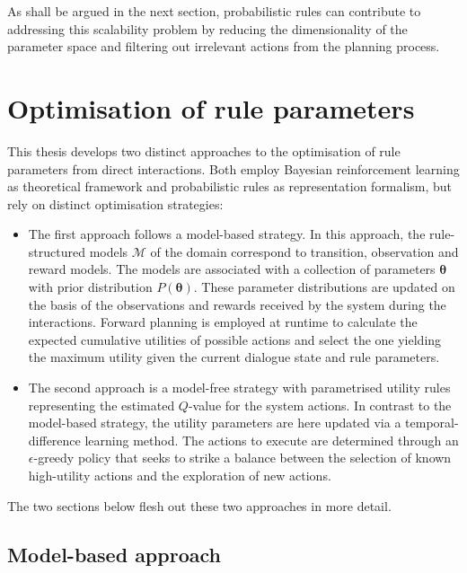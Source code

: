 As shall be argued in the next section, probabilistic rules can contribute to addressing this scalability problem by reducing the dimensionality of the parameter space and filtering out irrelevant actions from the planning process.

\section{Optimisation of rule parameters}
\label{sec:rl-ruleparams}

This thesis develops two distinct approaches to the optimisation of rule parameters from direct interactions. Both employ Bayesian reinforcement learning as theoretical framework and probabilistic rules as representation formalism, but rely on distinct optimisation strategies:

\begin{itemize}
\item The first approach follows a model-based strategy.  In this approach, the rule-structured models $\mathcal{M}$ of the domain correspond to transition, observation and reward models. The models are associated with a collection of parameters $\boldsymbol\theta$ with prior distribution $P(\boldsymbol\theta)$.  These parameter distributions are updated on the basis of the observations and rewards received by the system during the interactions. Forward planning is employed at runtime to calculate the expected cumulative utilities of possible actions and select the one yielding the maximum utility given the current dialogue state and rule parameters. 

\item The second approach is a model-free strategy with parametrised utility rules representing the estimated $Q$-value for the system actions. In contrast to the model-based strategy, the utility parameters are here updated via a temporal-difference learning method.  The actions to execute are determined through an $\epsilon$-greedy policy that seeks to strike a balance between the selection of known high-utility actions and the exploration of new actions.

\end{itemize}

The two sections below flesh out these two approaches in more detail. 

\subsection{Model-based approach}
\label{sec:modelbased}

